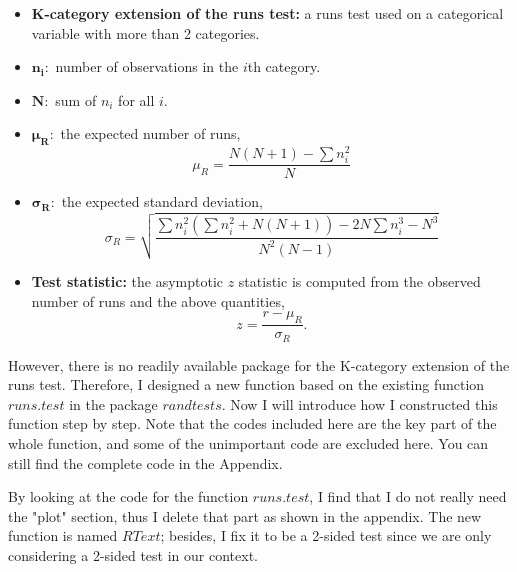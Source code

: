 \documentclass[12pt]{article}
\theoremstyle{plain}
\theoremstyle{definition}
\theoremstyle{remark}
\begin{document}
\begin{itemize}
    \item \textbf{K-category extension of the runs test:} a runs test used on a categorical variable with more than 2 categories.
    \item $\mathbf{n_i}:$ number of observations in the $i$th category.
    \item $\mathbf N:$ sum of $n_i$ for all $i$.
    \item $\mathbf{\mu_R}:$ the expected number of runs,
    $$\mu_R=\frac{N(N+1)-\sum n_i^2}{N}$$
    \item $\mathbf{\sigma_R}:$ the expected standard deviation,
    \[\sigma_R=\sqrt{\frac{\sum n_i^2(\sum n_i^2+N(N+1))-2N\sum n_i^3-N^3}{N^2(N-1)}}\]
    \item \textbf{Test statistic:} the asymptotic $z$ statistic is computed from the observed number of runs and the above quantities, $$z=\frac{r-\mu_R}{\sigma_R}.$$
\end{itemize}

However, there is no readily available package for the K-category extension of the runs test. Therefore, I designed a new function based on the existing function $runs.test$ in the package $randtests$. Now I will introduce how I constructed this function step by step. Note that the codes included here are the key part of the whole function, and some of the unimportant code are excluded here. You can still find the complete code in the Appendix.

By looking at the code for the function $runs.test$, I find that I do not really need the "plot" section, thus I delete that part as shown in the appendix. The new function is named $RText$; besides, I fix it to be a 2-sided test since we are only considering a 2-sided test in our context.
 
\end{document}
